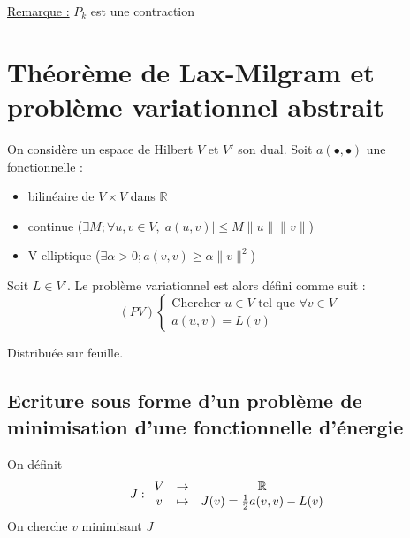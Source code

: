\underline{Remarque :} $P_k$ est une contraction


\section{Théorème de Lax-Milgram et problème variationnel abstrait}
On considère un espace de Hilbert $V$ et $V'$ son dual. Soit $a(\bullet,\bullet)$ une fonctionnelle :
\begin{itemize}
	\item bilinéaire de $V\times V$ dans $\mathbb{R}$
	\item continue ($\exists M; \forall u,v\in V, |a(u,v)|\leq M\|u\|\|v\|$)
	\item V-elliptique ($\exists \alpha>0; a(v,v)\geq \alpha\|v\|^2$)
\end{itemize}

Soit $L\in V'$. Le problème variationnel est alors défini comme suit :
\[(PV)\left\{\begin{array}{c} \text{Chercher } u\in V \text{ tel que } \forall v\in V \\
a(u,v)=L(v) \end{array}\right. \]


\begin{dem}
Distribuée sur feuille.
\end{dem}


\subsection{Ecriture sous forme d'un problème de minimisation d'une fonctionnelle d'énergie}
On définit \[J:\begin{array}{c c c} V &\to& \mathbb{R} \\ v&\mapsto& J(v)=\frac{1}{2}a(v,v)-L(v) \end{array}\]
On cherche $v$ minimisant $J$

